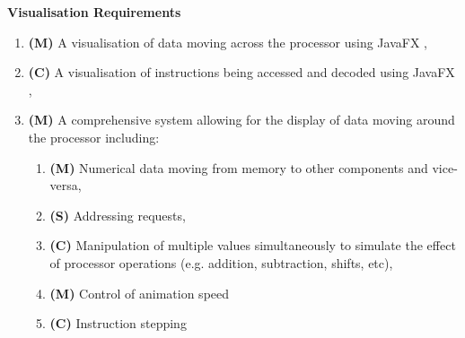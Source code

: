\textbf{Visualisation Requirements}
\begin{enumerate}[label={V\theenumi}]
       \item \label{req:v1} \textbf{(M)} A visualisation of data moving across the processor using JavaFX \cite{sunmicrosystems_2022_javafx},
    \item \label{req:v2} \textbf{(C)} A visualisation of instructions being accessed and decoded using JavaFX \cite{sunmicrosystems_2022_javafx},
    \item \label{req:v3} \textbf{(M)} A comprehensive system allowing for the display of data moving around the processor including:
    \begin{enumerate}
        \item \label{req:v3_a} \textbf{(M)} Numerical data moving from memory to other components and vice-versa,
        \item \label{req:v3_b} \textbf{(S)} Addressing requests,
        \item \label{req:v3_c} \textbf{(C)} Manipulation of multiple values simultaneously to simulate the effect of processor operations (e.g. addition, subtraction, shifts, etc),
        \item \label{req:v3_d} \label{req:speed} \textbf{(M)} Control of animation speed
        \item \label{req:v3_e} \textbf{(C)} Instruction stepping
    \end{enumerate}
\end{enumerate}


